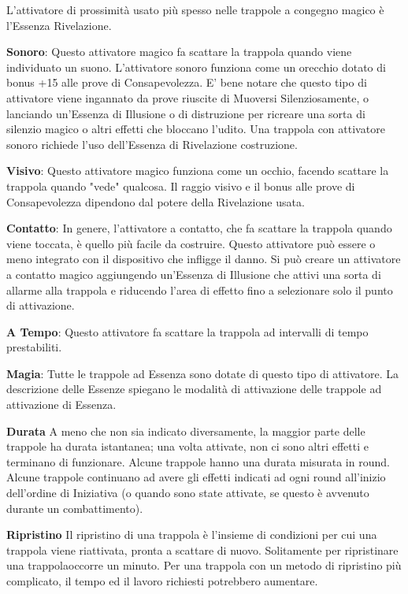 \documentclass[a4paper,11pt,twoside,openany]{book}
\begin{document}
L'attivatore di prossimità usato più spesso nelle trappole a congegno magico è l'Essenza Rivelazione.

\textbf{Sonoro}: Questo attivatore magico fa scattare la trappola quando viene individuato un suono. L'attivatore sonoro funziona come un orecchio dotato di bonus +15 alle prove di Consapevolezza. E' bene notare che questo tipo di attivatore viene ingannato da prove riuscite di Muoversi Silenziosamente, o lanciando un'Essenza di Illusione o di distruzione per ricreare una sorta di silenzio magico o altri effetti che bloccano l'udito. Una trappola con attivatore sonoro richiede l'uso dell'Essenza di Rivelazione costruzione.

\textbf{Visivo}: Questo attivatore magico funziona come un occhio, facendo scattare la trappola quando "vede" qualcosa. Il raggio visivo e il bonus alle prove di Consapevolezza dipendono dal potere della Rivelazione usata.

\textbf{Contatto}: In genere, l'attivatore a contatto, che fa scattare la trappola quando viene toccata, è quello più facile da costruire. Questo attivatore può essere o meno integrato con il dispositivo che infligge il danno. Si può creare un attivatore a contatto magico aggiungendo un'Essenza di Illusione che attivi una sorta di allarme alla trappola e riducendo l'area di effetto fino a selezionare solo il punto di attivazione.

\textbf{A Tempo}: Questo attivatore fa scattare la trappola ad intervalli di tempo prestabiliti.

\textbf{Magia}: Tutte le trappole ad Essenza sono dotate di questo tipo di attivatore. La descrizione delle Essenze spiegano le modalità di attivazione delle trappole ad attivazione di Essenza.

\textbf{Durata}
A meno che non sia indicato diversamente, la maggior parte delle trappole ha durata istantanea; una volta attivate, non ci sono altri effetti e terminano di funzionare. Alcune trappole hanno una durata misurata in round. Alcune trappole continuano ad avere gli effetti indicati ad ogni round all'inizio dell'ordine di Iniziativa (o quando sono state attivate, se questo è avvenuto durante un combattimento).

\textbf{Ripristino}
Il ripristino di una trappola è l'insieme di condizioni per cui una trappola viene riattivata, pronta a scattare di nuovo. Solitamente per ripristinare una trappolaoccorre un minuto. Per una trappola con un metodo di ripristino più complicato, il tempo ed il lavoro richiesti potrebbero aumentare.
\end{document}
